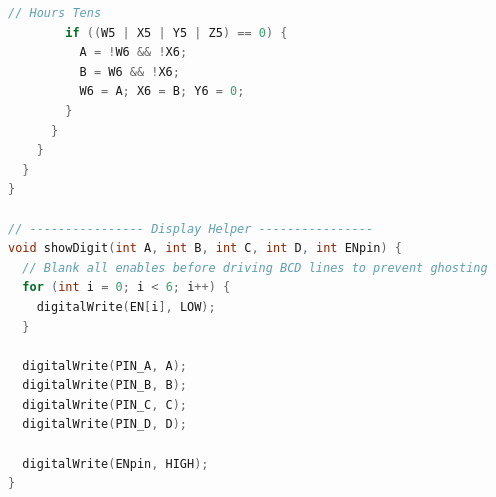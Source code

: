 \documentclass{article}
\begin{document}
\begin{lstlisting}[language=C++]
        // Hours Tens
        if ((W5 | X5 | Y5 | Z5) == 0) {
          A = !W6 && !X6;
          B = W6 && !X6;
          W6 = A; X6 = B; Y6 = 0;
        }
      }
    }
  }
}

// ---------------- Display Helper ----------------
void showDigit(int A, int B, int C, int D, int ENpin) {
  // Blank all enables before driving BCD lines to prevent ghosting
  for (int i = 0; i < 6; i++) {
    digitalWrite(EN[i], LOW);
  }
  
  digitalWrite(PIN_A, A);
  digitalWrite(PIN_B, B);
  digitalWrite(PIN_C, C);
  digitalWrite(PIN_D, D);
  
  digitalWrite(ENpin, HIGH);
}
\end{lstlisting}
\end{document}
